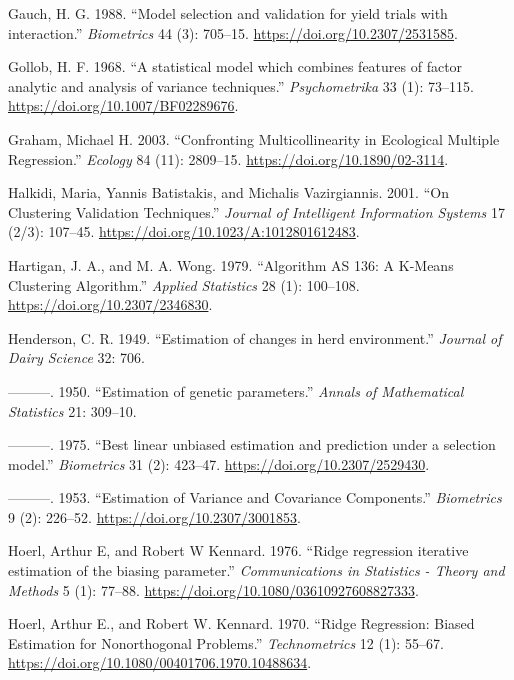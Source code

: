 \documentclass[
]{book}
\numberwithin{equation}{section}
\newlength{\cslhangindent}
\newenvironment{cslreferences}%
  {\setlength{\parindent}{0pt}%
  \everypar{\setlength{\hangindent}{\cslhangindent}}\ignorespaces}%
  {\par}
\begin{document}
\begin{cslreferences}
\leavevmode\hypertarget{ref-Gauch1988}{}%
Gauch, H. G. 1988. ``Model selection and validation for yield trials with interaction.'' \emph{Biometrics} 44 (3): 705--15. \url{https://doi.org/10.2307/2531585}.

\leavevmode\hypertarget{ref-Gollob1968}{}%
Gollob, H. F. 1968. ``A statistical model which combines features of factor analytic and analysis of variance techniques.'' \emph{Psychometrika} 33 (1): 73--115. \url{https://doi.org/10.1007/BF02289676}.

\leavevmode\hypertarget{ref-Graham2003}{}%
Graham, Michael H. 2003. ``Confronting Multicollinearity in Ecological Multiple Regression.'' \emph{Ecology} 84 (11): 2809--15. \url{https://doi.org/10.1890/02-3114}.

\leavevmode\hypertarget{ref-Halkidi2001}{}%
Halkidi, Maria, Yannis Batistakis, and Michalis Vazirgiannis. 2001. ``On Clustering Validation Techniques.'' \emph{Journal of Intelligent Information Systems} 17 (2/3): 107--45. \url{https://doi.org/10.1023/A:1012801612483}.

\leavevmode\hypertarget{ref-Hartigan1979}{}%
Hartigan, J. A., and M. A. Wong. 1979. ``Algorithm AS 136: A K-Means Clustering Algorithm.'' \emph{Applied Statistics} 28 (1): 100--108. \url{https://doi.org/10.2307/2346830}.

\leavevmode\hypertarget{ref-Henderson1949}{}%
Henderson, C. R. 1949. ``Estimation of changes in herd environment.'' \emph{Journal of Dairy Science} 32: 706.

\leavevmode\hypertarget{ref-Henderson1950}{}%
---------. 1950. ``Estimation of genetic parameters.'' \emph{Annals of Mathematical Statistics} 21: 309--10.

\leavevmode\hypertarget{ref-Henderson1975}{}%
---------. 1975. ``Best linear unbiased estimation and prediction under a selection model.'' \emph{Biometrics} 31 (2): 423--47. \url{https://doi.org/10.2307/2529430}.

\leavevmode\hypertarget{ref-Henderson1953}{}%
---------. 1953. ``Estimation of Variance and Covariance Components.'' \emph{Biometrics} 9 (2): 226--52. \url{https://doi.org/10.2307/3001853}.

\leavevmode\hypertarget{ref-Hoerl1976}{}%
Hoerl, Arthur E, and Robert W Kennard. 1976. ``Ridge regression iterative estimation of the biasing parameter.'' \emph{Communications in Statistics - Theory and Methods} 5 (1): 77--88. \url{https://doi.org/10.1080/03610927608827333}.

\leavevmode\hypertarget{ref-Hoerl1970}{}%
Hoerl, Arthur E., and Robert W. Kennard. 1970. ``Ridge Regression: Biased Estimation for Nonorthogonal Problems.'' \emph{Technometrics} 12 (1): 55--67. \url{https://doi.org/10.1080/00401706.1970.10488634}.


\end{cslreferences}
\end{document}
